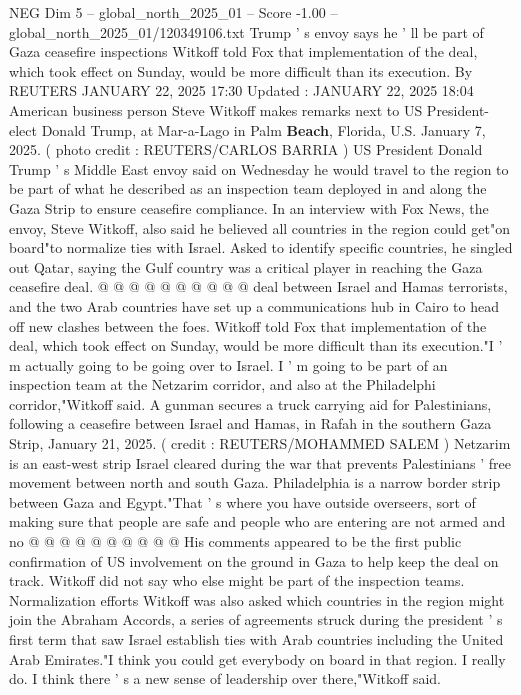 \begin{textsample}{NEG Dim 5 – global\_north\_2025\_01 – Score -1.00 – global\_north\_2025\_01/120349106.txt}  \label{ex:f5_neg_076}
Trump ' s envoy says he ' ll be part of Gaza ceasefire inspections Witkoff told Fox that implementation of the deal, which took effect on Sunday, would be more difficult than its execution.
By REUTERS JANUARY 22, 2025 17:30 Updated : JANUARY 22, 2025 18:04 American business person Steve Witkoff makes remarks next to US President-elect Donald Trump, at Mar-a-Lago in Palm \textbf{Beach}, Florida, U.S.
January 7, 2025. ( photo credit : REUTERS/CARLOS BARRIA ) US President Donald Trump ' s Middle East envoy said on Wednesday he would travel to the region to be part of what he described as an inspection team deployed in and along the Gaza Strip to ensure ceasefire compliance.
In an interview with Fox News, the envoy, Steve Witkoff, also said he believed all countries in the region could get"on board"to normalize ties with Israel.
Asked to identify specific countries, he singled out Qatar, saying the Gulf country was a critical player in reaching the Gaza ceasefire deal. @ @ @ @ @ @ @ @ @ @ deal between Israel and Hamas terrorists, and the two Arab countries have set up a communications hub in Cairo to head off new clashes between the foes.
Witkoff told Fox that implementation of the deal, which took effect on Sunday, would be more difficult than its execution."I ' m actually going to be going over to Israel.
I ' m going to be part of an inspection team at the Netzarim corridor, and also at the Philadelphi corridor,"Witkoff said.
A gunman secures a truck carrying aid for Palestinians, following a ceasefire between Israel and Hamas, in Rafah in the southern Gaza Strip, January 21, 2025. ( credit : REUTERS/MOHAMMED SALEM ) Netzarim is an east-west strip Israel cleared during the war that prevents Palestinians ' free movement between north and south Gaza.
Philadelphia is a narrow border strip between Gaza and Egypt."That ' s where you have outside overseers, sort of making sure that people are safe and people who are entering are not armed and no @ @ @ @ @ @ @ @ @ @ His comments appeared to be the first public confirmation of US involvement on the ground in Gaza to help keep the deal on track.
Witkoff did not say who else might be part of the inspection teams.
Normalization efforts Witkoff was also asked which countries in the region might join the Abraham Accords, a series of agreements struck during the president ' s first term that saw Israel establish ties with Arab countries including the United Arab Emirates."I think you could get everybody on board in that region.
I really do.
I think there ' s a new sense of leadership over there,"Witkoff said.

\end{textsample}
